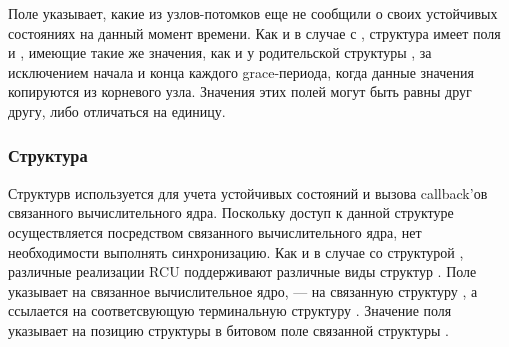 Поле  указывает, какие из узлов-потомков еще не сообщили
о своих устойчивых состояниях на данный момент времени.
%
Как и в случае с , структура  имеет поля
 и , имеющие такие же значения, как и у родительской
структуры , за исключением начала и конца каждого
grace-периода, когда данные значения копируются из корневого узла.
Значения этих полей могут быть равны друг другу, либо отличаться на единицу.


\subsubsection{Структура } \label{sec:rcu_data}
Структурв  используется для учета устойчивых состояний и
вызова callback'ов связанного вычислительного ядра.
Поскольку доступ к данной структуре осуществляется посредством
связанного вычислительного ядра, нет необходимости выполнять синхронизацию.
Как и в случае со структурой , различные реализации RCU поддерживают
различные виды структур .
%
Поле  указывает на связанное вычислительное ядро,
 --- на связанную структуру ,
а  ссылается на соответсвующую терминальную структуру .
Значение поля  указывает на позицию структуры 
в битовом поле  связанной структуры .

